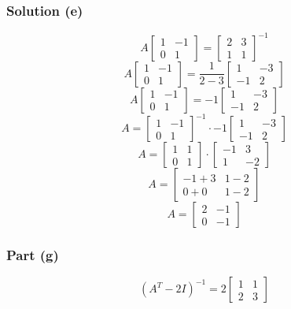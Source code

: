 \documentclass[12pt]{article}
\begin{document}
\subsubsection*{Solution (e)}
\[
  A 
  \begin{bmatrix}
    1 & -1\\ 
    0 & 1 
  \end{bmatrix}
  = 
  \begin{bmatrix}
    2 & 3\\ 
    1 & 1 
  \end{bmatrix}^{-1}
\]
\[
  A 
  \begin{bmatrix}
    1 & -1\\ 
    0 & 1 
  \end{bmatrix}
  = \frac{1}{2 - 3} 
  \begin{bmatrix}
    1 & -3\\ 
    -1 & 2 
  \end{bmatrix}
\]
\[
  A 
  \begin{bmatrix}
    1 & -1\\ 
    0 & 1 
  \end{bmatrix}
  = -1
  \begin{bmatrix}
    1 & -3\\ 
    -1 & 2 
  \end{bmatrix}
\]
\[
  A = 
  \begin{bmatrix}
    1 & -1\\ 
    0 & 1 
  \end{bmatrix}^{-1}
  \cdot -1
  \begin{bmatrix}
    1 & -3\\ 
    -1 & 2 
  \end{bmatrix}
\]
\[
  A = 
  \begin{bmatrix}
    1 & 1\\ 
    0 & 1 
  \end{bmatrix}
  \cdot 
  \begin{bmatrix}
    -1 & 3\\ 
    1 & -2 
  \end{bmatrix}
\]
\[
  A = 
  \begin{bmatrix}
    -1 + 3 & 1 - 2\\ 
    0 + 0 & 1 - 2 
  \end{bmatrix}
\]
\[
  A = 
  \begin{bmatrix}
    2 & -1\\ 
    0 & -1 
  \end{bmatrix}
\]
\vspace{0.25in}
\subsubsection*{Part (g)}
\[
  \left(A^T - 2I\right)^{-1} = 2\begin{bmatrix}
    1 & 1\\ 
    2 & 3 
  \end{bmatrix}
\]
\vspace{0.25in}
\end{document}

